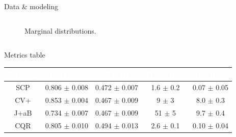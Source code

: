 \documentclass{beamer}
\begin{document}
\begin{frame}{Data \& modeling}
\begin{columns}
\begin{column}{0.5\textwidth}
\begin{figure}
                \caption{Marginal distributions.}
            \end{figure}
        \end{column}
    \end{columns}
\end{frame}


\begin{frame}{Metrics table}

    \begin{table}[ht]
        
        \begin{subtable}{.5\textwidth}
            \hspace{-32mm}
            \begin{tabular}{|c|c|c|c|c|}
            \rowcolor{ColHead}\textcolor{white}{Strategy} & \textcolor{white}{Coverage} & \textcolor{white}{RMSE} & \textcolor{white}{Train. time} & \textcolor{white}{Inf. time}\\ \hline
            \cellcolor{RowHead}SCP & 0.806 $\pm$ 0.008 & 0.472 $\pm$ 0.007 & 1.6 $\pm$ 0.2 & 0.07 $\pm$ 0.05\\
            \cellcolor{RowHead}CV+ & 0.853 $\pm$ 0.004 & 0.467 $\pm$ 0.009 & 9 $\pm$ 3 & 8.0 $\pm$ 0.3\\
            \cellcolor{RowHead}J+aB & 0.734 $\pm$ 0.007 & 0.467 $\pm$ 0.009 & 51 $\pm$ 5 & 9.7 $\pm$ 0.4\\
            \cellcolor{RowHead}CQR & 0.805 $\pm$ 0.010 & 0.494 $\pm$ 0.013 & 2.6 $\pm$ 0.1 & 0.10 $\pm$ 0.04\\
            \hline
            \end{tabular}
        \end{subtable}
        

\end{table}
\end{frame}
\end{document}
